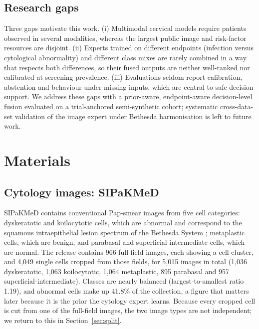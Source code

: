 \documentclass[lettersize,journal]{IEEEtran}
\begin{document}
\subsection{Research gaps}
Three gaps motivate this work. (i) Multimodal cervical models require patients observed in several modalities, whereas the largest public image and risk-factor resources are disjoint. (ii) Experts trained on different endpoints (infection versus cytological abnormality) and different class mixes are rarely combined in a way that respects both differences, so their fused outputs are neither well-ranked nor calibrated at screening prevalence. (iii) Evaluations seldom report calibration, abstention and behaviour under missing inputs, which are central to safe decision support. We address these gaps with a prior-aware, endpoint-aware decision-level fusion evaluated on a trial-anchored semi-synthetic cohort; systematic cross-data-set validation of the image expert under Bethesda harmonisation is left to future work.

\section{Materials}

\subsection{Cytology images: SIPaKMeD}
SIPaKMeD \cite{plissiti2018sipakmed} contains conventional Pap-smear images from five cell categories: dyskeratotic and koilocytotic cells, which are abnormal and correspond to the squamous intraepithelial lesion spectrum of the Bethesda System \cite{solomon2002bethesda}; metaplastic cells, which are benign; and parabasal and superficial-intermediate cells, which are normal. The release contains 966 full-field images, each showing a cell cluster, and 4,049 single cells cropped from those fields, for 5,015 images in total (1,036 dyskeratotic, 1,063 koilocytotic, 1,064 metaplastic, 895 parabasal and 957 superficial-intermediate). Classes are nearly balanced (largest-to-smallest ratio 1.19), and abnormal cells make up 41.8\% of the collection, a figure that matters later because it is the prior the cytology expert learns. Because every cropped cell is cut from one of the full-field images, the two image types are not independent; we return to this in Section~\ref{sec:split}.
\end{document}
